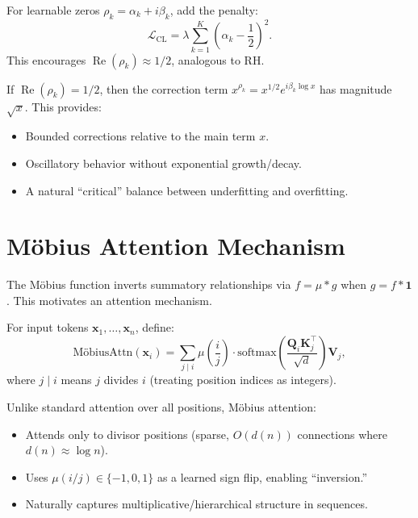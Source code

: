\begin{definition}
  For learnable zeros $\rho_k = \alpha_k + i\beta_k$, add the penalty:
  \begin{equation}
    \mathcal{L}_{\text{CL}} = \lambda \sum_{k=1}^{K} \left(\alpha_k - \frac{1}{2}\right)^2.
  \end{equation}
  This encourages $\operatorname{Re}(\rho_k) \approx 1/2$, analogous to RH.
\end{definition}

\begin{proposition}
  If $\operatorname{Re}(\rho_k) = 1/2$, then the correction term $x^{\rho_k} = x^{1/2} e^{i \beta_k \log x}$ has magnitude $\sqrt{x}$. This provides:
  \begin{itemize}
    \item Bounded corrections relative to the main term $x$.
    \item Oscillatory behavior without exponential growth/decay.
    \item A natural ``critical'' balance between underfitting and overfitting.
  \end{itemize}
\end{proposition}

\section{M\"obius Attention Mechanism}

The M\"obius function inverts summatory relationships via $f = \mu * g$ when $g = f * \mathbf{1}$. This motivates an attention mechanism.

\begin{definition}
  For input tokens $\mathbf{x}_1, \ldots, \mathbf{x}_n$, define:
  \begin{equation}
    \text{M\"obiusAttn}(\mathbf{x}_i) = \sum_{j \mid i} \mu\left(\frac{i}{j}\right) \cdot \text{softmax}\left(\frac{\mathbf{Q}_i \mathbf{K}_j^\top}{\sqrt{d}}\right) \mathbf{V}_j,
  \end{equation}
  where $j \mid i$ means $j$ divides $i$ (treating position indices as integers).
\end{definition}

\begin{remark}
  Unlike standard attention over all positions, M\"obius attention:
  \begin{itemize}
    \item Attends only to divisor positions (sparse, $O(d(n))$ connections where $d(n) \approx \log n$).
    \item Uses $\mu(i/j) \in \{-1, 0, 1\}$ as a learned sign flip, enabling ``inversion.''
    \item Naturally captures multiplicative/hierarchical structure in sequences.
  \end{itemize}
\end{remark}

